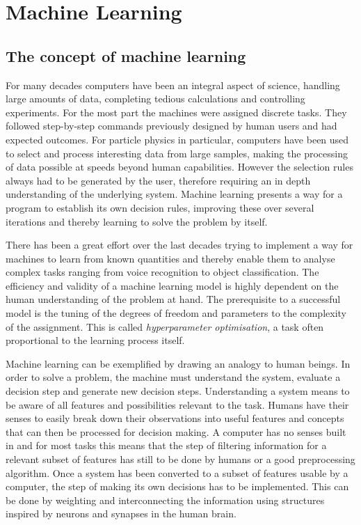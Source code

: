 \chapter{Machine Learning}

\section{The concept of machine learning}

For many decades computers have been an integral aspect of science, handling large amounts of data, completing tedious calculations and controlling experiments. For the most part the  machines were assigned discrete tasks. They followed step-by-step commands previously designed by human users and had expected outcomes. 
For particle physics in particular, computers have been used to select and process interesting data from large samples, making the processing of data possible at speeds beyond human capabilities. However the selection rules always had to be generated by the user, therefore requiring an in depth understanding of the underlying system. Machine learning presents a way for a program to establish its own decision rules, improving these over several iterations and thereby learning to solve the problem by itself.

There has been a great effort over the last decades trying to implement a way for machines to learn from known quantities and thereby enable them to analyse complex tasks ranging from voice recognition to object classification.
The efficiency and validity of a machine learning model is highly dependent on the human understanding of the problem at hand. The prerequisite to a successful model is the tuning of the degrees of freedom and parameters to the complexity of the assignment. This is called \emph{hyperparameter optimisation}, a task often proportional to the learning process itself.


Machine learning can be exemplified by drawing an analogy to human beings. In order to solve a problem, the machine must understand the system, evaluate a decision step and generate new decision steps.
Understanding a system means to be aware of all features and possibilities relevant to the task. Humans have their senses to easily break down their observations into useful features and concepts that can then be processed for decision making. A computer has no senses built in and for most tasks this means that the step of filtering information for a relevant subset of features has still to be done by humans or a good preprocessing algorithm.
Once a system has been converted to a subset of features usable by a computer, the step of making its own decisions has to be implemented. This can be done by weighting and interconnecting the information using structures inspired by neurons and synapses in the human brain. 


